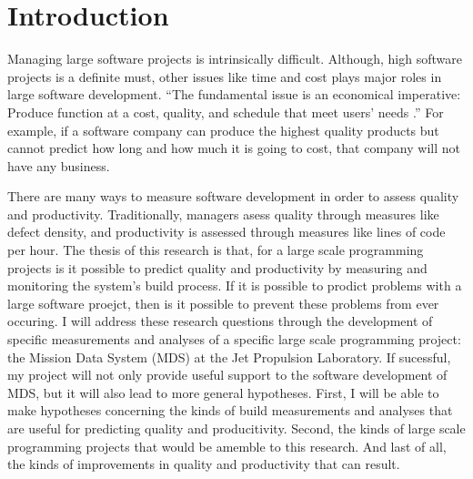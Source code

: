 
\chapter{Introduction}

Managing large software projects is intrinsically difficult.  Although,
high software projects is a definite must, other issues like time and cost
plays major roles in large software development.  ``The fundamental issue
is an economical imperative: Produce function at a cost, quality, and
schedule that meet users' needs \cite{humphrey_1985}.''  For example,
if a software company can produce the highest quality products but cannot
predict how long and how much it is going to cost, that company will not
have any business. 

There are many ways to measure software development in order to assess
quality and productivity.  Traditionally, managers asess quality through
measures like defect density, and productivity is assessed through measures 
like lines of code per hour.  The thesis of this research is that, for a
large scale programming projects is it possible to predict quality and
productivity by measuring and monitoring the system's build process.  If it 
is possible to prodict problems with a large software proejct, then is it
possible to prevent these problems from ever occuring.  I will address
these research questions through the development of specific measurements
and analyses of a specific large scale programming project: the Mission
Data System (MDS) at the Jet Propulsion Laboratory.  If sucessful, my
project will not only provide useful support to the software development of 
MDS, but it will also lead to more general hypotheses.  First, I will be
able to make hypotheses concerning the kinds of build measurements and
analyses that are useful for predicting quality and producitivity.  Second, 
the kinds of large scale programming projects that would be amemble to this
research.  And last of all, the kinds of improvements in quality and
productivity that can result.


